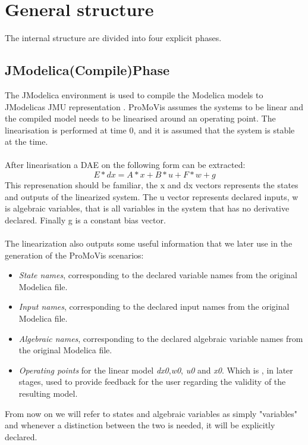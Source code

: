 \section{General structure}
The internal structure are divided into four explicit phases. 
\subsection{JModelica(Compile)Phase}
The JModelica environment is used to compile the Modelica models to JModelicas JMU representation \cite{jmodelicaorg}\nocite{*}. ProMoVis assumes the systems to be linear and the compiled model needs to be linearised around an operating point. The linearisation is performed at time 0, and it is assumed that the system is stable at the time.\\\\After linearisation a DAE on the following form can be extracted:
\begin{equation}
E*dx = A*x + B*u + F*w + g
\end{equation}
This represenation should be familiar, the x and dx vectors represents the states and outputs of the linearized system. The u vector represents declared inputs, w is algebraic variables, that is all variables in the system that has no derivative declared. Finally g is a constant bias vector.\\\\The linearization also outputs some useful information that we later use in the generation of the ProMoVis scenarios:
\begin{itemize}
\item \textit{State names}, corresponding to the declared variable names from the original Modelica file.
\item \textit{Input names}, corresponding to the declared input names from the original Modelica file.
\item \textit{Algebraic names}, corresponding to the declared algebraic variable names from the original Modelica file.
\item \textit{Operating points} for the linear model \textit{dx0},\textit{w0}, \textit{u0} and \textit{x0}. Which is , in later stages, used to provide feedback for the user regarding the validity of the resulting model.
\end{itemize}
From now on we will refer to states and algebraic variables as simply "variables" and whenever a distinction between the two is needed, it will be explicitly declared. 

